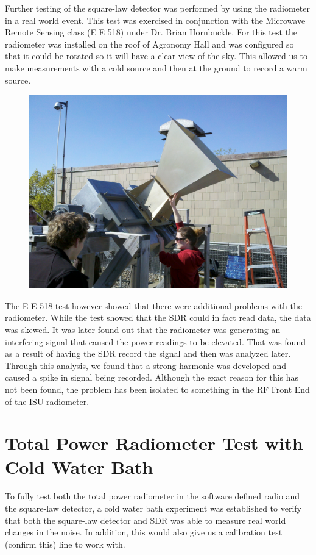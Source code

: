 Further testing of the square-law detector was performed by using the radiometer in a real world event.  This test was exercised in conjunction with the Microwave Remote Sensing class (E E 518) under Dr. Brian Hornbuckle.  For this test the radiometer was installed on the roof of Agronomy Hall and was configured so that it could be rotated so it will have a clear view of the sky.  This allowed us to make measurements with a cold source and then at the ground to record a warm source.


{\begin{figure}[h!tb] 
\centering
\includegraphics[width=\textwidth]{Images/radiometer_roof.jpg}
\label{radiometer_roof}
\end{figure}
}

The E E 518 test however showed that there were additional problems with the radiometer.  While the test showed that the SDR could in fact read data, the data was skewed.  It was later found out that the radiometer was generating an interfering signal that caused the power readings to be elevated.  That was found as a result of having the SDR record the signal and then was analyzed later.  Through this analysis, we found that a strong harmonic was developed and caused a spike in signal being recorded.  Although the exact reason for this has not been found, the problem has been isolated to something in the RF Front End of the ISU radiometer.  
\section{Total Power Radiometer Test with Cold Water Bath}
To fully test both the total power radiometer in the software defined radio and the square-law detector, a cold water bath experiment was established to verify that both the square-law detector and SDR was able to measure real world changes in the noise.  In addition, this would also give us a calibration test (confirm this) line to work with.

